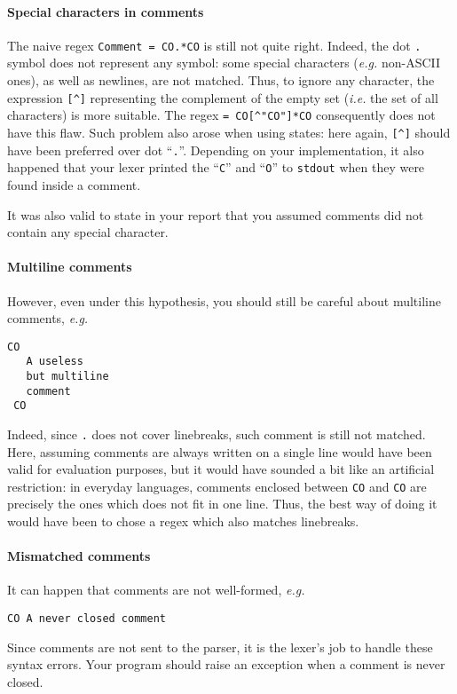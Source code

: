 \documentclass[a4paper]{article}
\begin{document}
\paragraph{Special characters in comments}
The naive regex \verb#Comment = CO.*CO# is still not quite right. Indeed, the dot \texttt{.} symbol does not represent any symbol: some special characters (\emph{e.g.} non-ASCII ones), as well as newlines, are not matched. Thus, to ignore any character, the expression \verb#[^]# representing the complement of the empty set (\emph{i.e.} the set of all characters) is more suitable. The regex \verb#= CO[^"CO"]*CO# consequently does not have this flaw. Such problem also arose when using states: here again, \verb#[^]# should have been preferred over dot ``\texttt{.}''. Depending on your implementation, it also happened that your lexer printed the ``\texttt{C}'' and ``\texttt{O}'' to \texttt{stdout} when they were found inside a comment.

It was also valid to state in your report that you assumed comments did not contain any special character.

\paragraph{Multiline comments}
However, even under this hypothesis, you should still be careful about multiline comments, \emph{e.g.}
\begin{verbatim}
CO
   A useless
   but multiline
   comment
 CO
\end{verbatim}
Indeed, since \texttt{.} does not cover linebreaks, such comment is still not matched. Here, assuming comments are always written on a single line would have been valid for evaluation purposes, but it would have sounded a bit like an artificial restriction: in everyday languages, comments enclosed between \texttt{CO} and \texttt{CO} are precisely the ones which does not fit in one line. Thus, the best way of doing it would have been to chose a regex which also matches linebreaks.


\paragraph{Mismatched comments}

It can happen that comments are not well-formed, \emph{e.g.}
\begin{verbatim}
CO A never closed comment
\end{verbatim}
Since comments are not sent to the parser, it is the lexer's job to handle these syntax errors. Your program should raise an exception when a comment is never closed.
\end{document}
